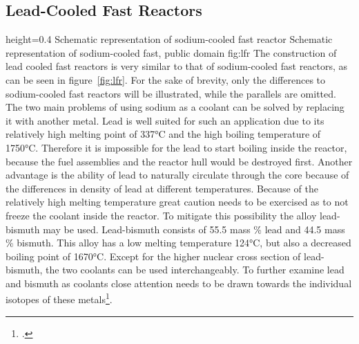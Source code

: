 \subsection{Lead-Cooled Fast Reactors}
    {height=0.4\textheight}
    {Schematic representation of sodium-cooled fast reactor}
    {Schematic representation of sodium-cooled fast, public domain}
    {fig:lfr}
The construction of lead cooled fast reactors is very similar to that of sodium-cooled fast reactors,
as can be seen in figure~\ref{fig:lfr}. For the sake of brevity, only the differences to sodium-cooled
fast reactors will be illustrated, while the parallels are omitted.\\
The two main problems of using sodium as a coolant can be solved by replacing it with another metal.
Lead is well suited for such an application due to its relatively high melting point of 337°C and
the high boiling temperature of 1750°C. Therefore it is impossible for the lead to start boiling inside
the reactor, because the fuel assemblies and the reactor hull would be destroyed first.
Another advantage is the ability of lead to naturally circulate through the core because of the differences
in density of lead at different temperatures.
Because of the relatively high melting temperature great caution needs to be exercised as to not freeze the coolant
inside the reactor. To mitigate this possibility the alloy lead-bismuth may be used. Lead-bismuth consists
of 55.5 mass \% lead and 44.5 mass \% bismuth. This alloy has a low melting temperature 124°C, but also
a decreased boiling point of 1670°C. Except for the higher nuclear cross section of lead-bismuth, the
two coolants can be used interchangeably. To further examine lead and bismuth as coolants close attention
needs to be drawn towards the individual isotopes of these metals\footcite[137-174]{IVHandbook}.
